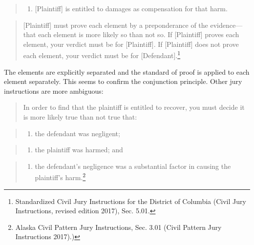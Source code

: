 \documentclass[
  10pt,
  dvipsnames,enabledeprecatedfontcommands]{scrartcl}
\providecommand{\tightlist}{%
  \setlength{\itemsep}{0pt}\setlength{\parskip}{0pt}}
\begin{document}
\begin{quote}
\begin{enumerate}
\def\labelenumi{\arabic{enumi}.}
\setcounter{enumi}{2}
\tightlist
\item
  {[}Plaintiff{]} is entitled to damages as compensation for that harm.
\end{enumerate}
\end{quote}

\begin{quote}
{[}Plaintiff{]} must prove each element by a preponderance of the
evidence---that each element is more likely so than not so. If
{[}Plaintiff{]} proves each element, your verdict must be for
{[}Plaintiff{]}. If {[}Plaintiff{]} does not prove each element, your
verdict must be for {[}Defendant{]}.\footnote{Standardized Civil Jury
  Instructions for the District of Columbia (Civil Jury Instructions,
  revised edition 2017), Sec. 5.01.}
\end{quote}

\noindent The elements are explicitly separated and the standard of
proof is applied to each element separately. This seems to confirm the
conjunction principle. Other jury instructions are more ambiguous:

\begin{quote}
In order to find that the plaintiff is entitled to recover, you must
decide it is more likely true than not true that:
\end{quote}

\begin{quote}
\begin{enumerate}
\def\labelenumi{\arabic{enumi}.}
\tightlist
\item
  the defendant was negligent;
\end{enumerate}
\end{quote}

\begin{quote}
\begin{enumerate}
\def\labelenumi{\arabic{enumi}.}
\setcounter{enumi}{1}
\tightlist
\item
  the plaintiff was harmed; and
\end{enumerate}
\end{quote}

\begin{quote}
\begin{enumerate}
\def\labelenumi{\arabic{enumi}.}
\setcounter{enumi}{2}
\tightlist
\item
  the defendant's negligence was a substantial factor in causing the
  plaintiff's harm.\footnote{Alaska Civil Pattern Jury Instructions,
    Sec. 3.01 (Civil Pattern Jury Instructions 2017).)}
\end{enumerate}
\end{quote}
\end{document}
